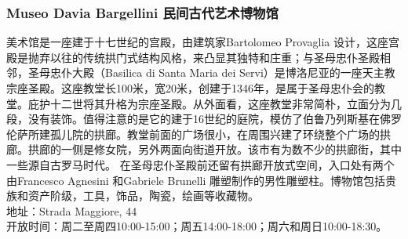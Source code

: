 \subsubsection{Museo Davia Bargellini  民间古代艺术博物馆}
美术馆是一座建于十七世纪的宫殿，由建筑家Bartolomeo Provaglia 设计，这座宫殿是抛弃以往的传统拱门式结构风格，来凸显其独特和庄重；与圣母忠仆圣殿相邻，圣母忠仆大殿（Basilica di Santa Maria dei Servi）是博洛尼亚的一座天主教宗座圣殿。这座教堂长100米，宽20米，创建于1346年，是属于圣母忠仆会的教堂。庇护十二世将其升格为宗座圣殿。从外面看，这座教堂非常简朴，立面分为几段，没有装饰。值得注意的是它的建于16世纪的庭院，模仿了伯鲁乃列斯基在佛罗伦萨所建孤儿院的拱廊。教堂前面的广场很小，在周围兴建了环绕整个广场的拱廊。拱廊的一侧是修女院，另外两面向街道开放。该市有为数不少的拱廊街，其中一些源自古罗马时代。
在圣母忠仆圣殿前还留有拱廊开放式空间，入口处有两个由Francesco Agnesini 和Gabriele Brunelli 雕塑制作的男性雕塑柱。博物馆包括贵族和资产阶级，工具，饰品，陶瓷，绘画等收藏物。\\
地址：Strada Maggiore, 44\\
开放时间：周二至周四10:00-15:00；周五14:00-18:00；周六和周日10:00-18:30。\\